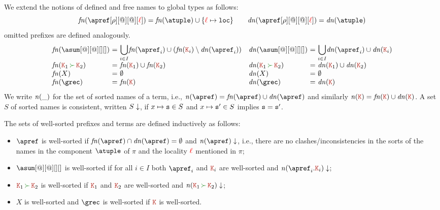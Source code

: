 We extend the notions of defined and free names to global types as
follows:
\[
 \fn{\apref[\arole][@][@][\alocvar]}
 = \fn \atuple \cup \{\alocvar \mapsto \asort[loc]\} 
\qquad
 \dn{\apref[\arole][@][@][\alocvar]} 
 = \dn \atuple 
\]
omitted prefixes are defined analogously.
\[
  \begin{array}{ll}
    \begin{array}{l@{\ =\ } ll}
      \fn{\asum[@][@][][]} & \displaystyle{\bigcup_{i\in I}} \fn{\apref_i} \cup (\fn{\aK_i}\setminus\dn{\apref_i})
      \\
      \fn{\aK_1 \seqop \aK_2} 
                &
                  \fn{\aK_1}\cup\fn{\aK_2}
      \\
      \fn X & \emptyset
      \\
      \fn \grec & \fn {\aK}
    \end{array}
    \begin{array}{l@{\ =\ } ll}
      \dn{\asum[@][@][][]} & \displaystyle{\bigcup_{i\in I}} \dn{\apref_i} \cup \dn{\aK_i}
      \\
      \dn{\aK_1 \seqop \aK_2} 
                           &
                             \dn{\aK_1}\cup\dn{\aK_2}
      \\
      \dn X & \emptyset
      \\
      \dn \grec & \dn {\aK}
    \end{array}
  \end{array}
\]
%
We write ${\it n}(\_)$ for the set of sorted names of a term, i.e.,
$\names \apref = \fn\apref \cup \dn\apref$ and similarly
$\names \aK = \fn\aK \cup \dn\aK$. A set $S$ of sorted names is
consistent, written $S\downarrow$, if $x\mapsto \mathtt{s} \in S$ and
$x\mapsto \mathtt{s}' \in S$ implies $\mathtt{s} = \mathtt{s}'$.
 
The sets of well-sorted prefixes and terms are defined inductively as follows:

\begin{itemize}
\item $\apref$ is well-sorted if $\fn\apref\cap\dn\apref = \emptyset$ and  
$\consistent{\names\apref}$, i.e., there are no clashes/inconsistencies in the sorts of 
the names in the component $\atuple$ of $\pi$ and the locality ${\color{red}\ell}$ mentioned in $\pi$;
\item $\asum[@][@][][]$ is well-sorted if for all ${i\in I}$ both
  $\apref_i$ and ${\aK_i}$ are well-sorted and
  $\consistent{\names {\apref_i.\aK_i}}$; 
  \item $\aK_1 \seqop \aK_2$ is well-sorted if $\aK_1$ and $\aK_2$ are
  well-sorted and $\consistent{\names{\aK_1 \seqop \aK_2}}$;
\item $X$ is well-sorted and $\grec$ is well-sorted if $\aK$ is
  well-sorted.
\end{itemize}


